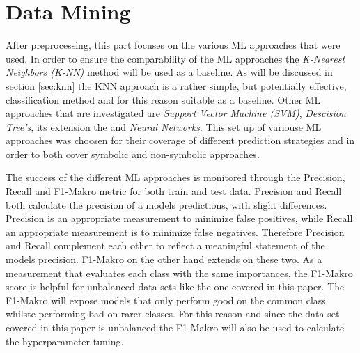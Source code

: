 \chapter{Data Mining}\label{sec:data_mining}





After preprocessing, this part focuses on the various ML approaches that were used. In order to ensure the comparability of the ML approaches the \textit{K-Nearest Neighbors (K-NN)} method will be used as a baseline. As will be discussed in section \ref{sec:knn} the KNN approach is a rather simple, but potentially effective, classification method and for this reason suitable as a baseline. Other ML approaches that are investigated are \textit{Support Vector Machine (SVM)}, \textit{Descision Tree's}, its extension the  and \textit{Neural Networks}. This set up of variouse ML approaches was choosen for their coverage of different prediction strategies and in order to both cover symbolic and non-symbolic approaches.

The success of the different ML approaches is monitored through the Precision, Recall and F1-Makro metric for both train and test data. 
Precision and Recall both calculate the precision of a models predictions, with slight differences. Precision is an appropriate measurement to minimize false positives, while Recall an appropriate measurement is to minimize false negatives. Therefore Precision and Recall complement each other to reflect a meaningful statement of the models precision.\cite{Brownlee2020} F1-Makro on the other hand extends on these two. As a measurement that evaluates each class with the same importances, the F1-Makro score is helpful for unbalanced data sets like the one covered in this paper. The F1-Makro will expose models that only perform good on the common class whilste performing bad on rarer classes. For this reason and since the data set covered in this paper is unbalanced the F1-Makro will also be used to calculate the hyperparameter tuning.\cite{Peltarion2021}

